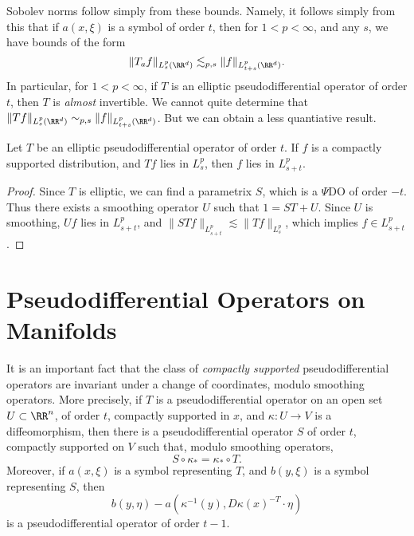 Sobolev norms follow simply from these bounds. Namely, it follows simply from this that if $a(x,\xi)$ is a symbol of order $t$, then for $1 < p < \infty$, and any $s$, we have bounds of the form
%
\[ \| T_a f \|_{L^p_s(\RR^d)} \lesssim_{p,s} \| f \|_{L^p_{t + s}(\RR^d)}. \]
%
In particular, for $1 < p < \infty$, if $T$ is an elliptic pseudodifferential operator of order $t$, then $T$ is \emph{almost} invertible. We cannot quite determine that $\| T f \|_{L^p_s(\RR^d)} \sim_{p,s} \| f \|_{L^p_{t + s}(\RR^d)}$. But we can obtain a less quantiative result.

\begin{theorem}
    Let $T$ be an elliptic pseudodifferential operator of order $t$. If $f$ is a compactly supported distribution, and $Tf$ lies in $L^p_s$, then $f$ lies in $L^p_{s + t}$.
\end{theorem}
\begin{proof}
    Since $T$ is elliptic, we can find a parametrix $S$, which is a $\Psi$DO of order $-t$. Thus there exists a smoothing operator $U$ such that $1 = ST + U$. Since $U$ is smoothing, $Uf$ lies in $L^p_{s + t}$, and $\| STf \|_{L^p_{s + t}} \lesssim \| Tf \|_{L^p_s}$, which implies $f \in L^p_{s + t}$.
\end{proof}















\section{Pseudodifferential Operators on Manifolds}

It is an important fact that the class of \emph{compactly supported} pseudodifferential operators are invariant under a change of coordinates, modulo smoothing operators. More precisely, if $T$ is a pseudodifferential operator on an open set $U \subset \RR^n$, of order $t$, compactly supported in $x$, and $\kappa: U \to V$ is a diffeomorphism, then there is a pseudodifferential operator $S$ of order $t$, compactly supported on $V$ such that, modulo smoothing operators,
%
\[ S \circ \kappa_* = \kappa_* \circ T. \]
%
Moreover, if $a(x,\xi)$ is a symbol representing $T$, and $b(y,\xi)$ is a symbol representing $S$, then
%
\[ b(y,\eta) - a(\kappa^{-1}(y), D\kappa(x)^{-T} \cdot \eta) \]
%
is a pseudodifferential operator of order $t - 1$.

